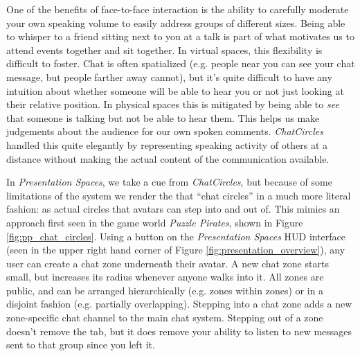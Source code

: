 One of the benefits of face-to-face interaction is the ability to carefully moderate your own speaking volume to easily address groups of different sizes. Being able to whisper to a friend sitting next to you at a talk is part of what motivates us to attend events together and sit together. In virtual spaces, this flexibility is difficult to foster. Chat is often spatialized (e.g. people near you can see your chat message, but people farther away cannot), but it's quite difficult to have any intuition about whether someone will be able to hear you or not just looking at their relative position. In physical spaces this is mitigated by being able to \emph{see} that someone is talking but not be able to hear them. This helps us make judgements about the audience for our own spoken comments. \emph{ChatCircles} handled this quite elegantly by representing speaking activity of others at a distance without making the actual content of the communication available. \citep{Viegas:1999kv}

In \emph{Presentation Spaces}, we take a cue from \emph{ChatCircles}, but because of some limitations of the system we render the that ``chat circles'' in a much more literal fashion: as actual circles that avatars can step into and out of. This mimics an approach first seen in the game world \emph{Puzzle Pirates}, shown in Figure \ref{fig:pp_chat_circles}. Using a button on the \emph{Presentation Spaces} HUD interface (seen in the upper right hand corner of Figure \ref{fig:presentation_overview}), any user can create a chat zone underneath their avatar. A new chat zone starts small, but increases its radius whenever anyone walks into it. All zones are public, and can be arranged hierarchically (e.g. zones within zones) or in a disjoint fashion (e.g. partially overlapping). Stepping into a chat zone adds a new zone-specific chat channel to the main chat system. Stepping out of a zone doesn't remove the tab, but it does remove your ability to listen to new messages sent to that group since you left it.

